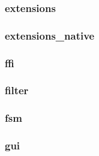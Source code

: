 \documentclass[a4paper]{article}
\begin{document}
\hypertarget{RefHeading17931167907073}{}\subsubsection{}
\clearpage\subsubsection[extensions]{extensions}
\hypertarget{RefHeading17951167907073}{}\subsubsection{}
\clearpage\subsubsection[extensions\_native]{extensions\_native}
\hypertarget{RefHeading17971167907073}{}\subsubsection{}
\clearpage\subsubsection[ffi]{ffi}
\hypertarget{RefHeading17991167907073}{}\subsubsection{}
\clearpage\subsubsection[filter]{filter}
\hypertarget{RefHeading18011167907073}{}\subsubsection{}
\clearpage\subsubsection[fsm]{fsm}
\hypertarget{RefHeading18031167907073}{}\subsubsection{}
\clearpage\subsubsection[gui]{gui}
\hypertarget{RefHeading18051167907073}{}\subsubsection{}
\end{document}
